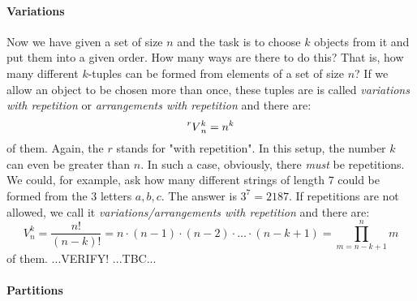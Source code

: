 

\paragraph{Variations}
Now we have given a set of size $n$ and the task is to choose $k$ objects from it and put them into a given order. How many ways are there to do this? That is, how many different $k$-tuples can be formed from elements of a set of size $n$? If we allow an object to be chosen more than once, these tuples are is called \emph{variations with repetition} or \emph{arrangements with repetition} and there are:
\begin{equation}
\prescript{r}{}{V}_n^k = n^k
\end{equation}
of them. Again, the $r$ stands for "with repetition". In this setup, the number $k$ can even be greater than $n$. In such a case, obviously, there \emph{must} be repetitions. We could, for example, ask how many different strings of length $7$ could be formed from the $3$ letters $a,b,c$. The answer is $3^7 = 2187$. If repetitions are not allowed, we call it \emph{variations/arrangements with repetition} and there are:
\begin{equation}
V_n^k = \frac{n!}{(n-k)!} 
      = n \cdot (n-1) \cdot (n-2) \cdot \ldots \cdot (n-k+1) 
      = \prod_{m=n-k+1}^{n} m
\end{equation}
of them. ...VERIFY! ...TBC...





% 

\paragraph{Partitions}



\begin{comment}



\end{comment}


